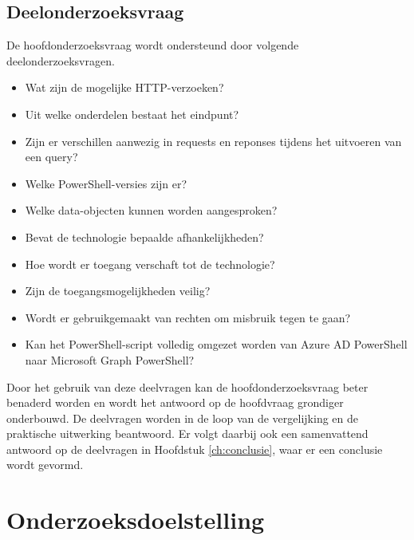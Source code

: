 \subsection{Deelonderzoeksvraag}

De hoofdonderzoeksvraag wordt ondersteund door volgende deelonderzoeksvragen. 

\begin{itemize}
   \item Wat zijn de mogelijke \Ac{HTTP}-verzoeken?
   \item Uit welke onderdelen bestaat het eindpunt?
   \item Zijn er verschillen aanwezig in requests en reponses tijdens het uitvoeren van een query?
   \item Welke PowerShell-versies zijn er?
   \item Welke data-objecten kunnen worden aangesproken?
   \item Bevat de technologie bepaalde afhankelijkheden?
   \item Hoe wordt er toegang verschaft tot de technologie?
   \item Zijn de toegangsmogelijkheden veilig?
   \item Wordt er gebruikgemaakt van rechten om misbruik tegen te gaan?
   \item Kan het PowerShell-script volledig omgezet worden van Azure \ac{AD} PowerShell naar Microsoft Graph PowerShell?
\end{itemize}

Door het gebruik van deze deelvragen kan de hoofdonderzoeksvraag beter benaderd worden en wordt het antwoord op de hoofdvraag grondiger onderbouwd. De deelvragen worden in de loop van de vergelijking en de praktische uitwerking beantwoord. Er volgt daarbij ook een samenvattend antwoord op de deelvragen in Hoofdstuk \ref{ch:conclusie}, waar er een conclusie wordt gevormd.

\section{Onderzoeksdoelstelling}%
\label{sec:onderzoeksdoelstelling}

\begin{comment}
Wat is het beoogde resultaat van je bachelorproef? Wat zijn de criteria voor succes? Beschrijf die zo concreet mogelijk. Gaat het bv.\ om een proof-of-concept, een prototype, een verslag met aanbevelingen, een vergelijkende studie, enz.
\end{comment}

